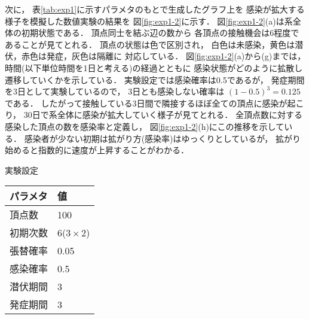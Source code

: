 \documentclass[10pt,oneside,fleqn]{scrartcl}
\begin{document}
\begin{figure}[htbp]
  \centering
  \setcounter{GraphPage}{8}
  \setcounter{GraphPage}{13}
  \setcounter{GraphPage}{18}
  \setcounter{GraphPage}{23}
  \setcounter{GraphPage}{28}
  \setcounter{GraphPage}{33}
\end{figure}

次に，
表\ref{tab:exp1}に示すパラメタのもとで生成したグラフ上を
感染が拡大する様子を模擬した数値実験の結果を
図\ref{fig:exp1-2}に示す．
図\ref{fig:exp1-2}(a)は系全体の初期状態である．
頂点同士を結ぶ辺の数から
各頂点の接触機会は6程度であることが見てとれる．
頂点の状態は色で区別され，
白色は未感染，黄色は潜伏，赤色は発症，灰色は隔離に
対応している．
図\ref{fig:exp1-2}(a)から(g)までは，
時間(以下単位時間を1日と考える)の経過とともに
感染状態がどのように拡散し遷移していくかを示している．
実験設定では感染確率は0.5であるが，
発症期間を3日として実験しているので，
3日とも感染しない確率は \((1-0.5)^3=0.125\) である．
したがって接触している3日間で隣接するほぼ全ての頂点に感染が起こり，
30日で系全体に感染が拡大していく様子が見てとれる．
全頂点数に対する感染した頂点の数を感染率と定義し，
図\ref{fig:exp1-2}(h)にこの推移を示している．
感染者が少ない初期は拡がり方(感染率)はゆっくりとしているが，
拡がり始めると指数的に速度が上昇することがわかる．

\begin{margintable}
  \caption{実験設定}
  \label{tab:exp1}
  \small
  \begin{tabular}{ll}
    \toprule
    パラメタ&値 \\
    \midrule
    頂点数&100 \\
    初期次数&6\;($3\times2$) \\
    張替確率&0.05 \\
    感染確率&0.5 \\
    潜伏期間&3 \\
    発症期間&3 \\
    \bottomrule
  \end{tabular}
\end{margintable}
\end{document}
